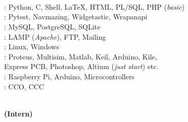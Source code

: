 \documentclass[a4paper,10pt]{memoir} %
\begin{document}
\begin{minipage}[t]{0.20\columnwidth}
 \\
 \\
 \\
 \\
\\
 \\
\quad \\
\\

\end{minipage}
\hfill
\begin{minipage}[t]{0.80\columnwidth}
: Python, C, Shell, \LaTeX, HTML, PL/SQL, PHP (\textit{basic})\\
: Pytest, Navmazing, Widgetastic, Wrapanapi\\ 
: MySQL, PostgreSQL, SQLite \\ 
: LAMP (\textit{Apache}), FTP, Mailing \\
: Linux, Windows\\
: Proteus, Multisim, Matlab, Keil, Arduino, Kile,\\ \phantom{.} %
Express PCB, Photoshop, Altium (\textit{just start}) etc.\\
: Raspberry Pi, Arduino, Microcontrollers\\ 
: CCO, CCC
\end{minipage}


\Sep %
\Sep
{}

\begin{minipage}[t]{0.20\columnwidth}
\end{minipage}
\hfill
\begin{minipage}[t]{0.80\columnwidth}
\begin{center}
\\
\textbf{(Intern)}
\end{center}
\end{minipage}
\Sep
\end{document}
